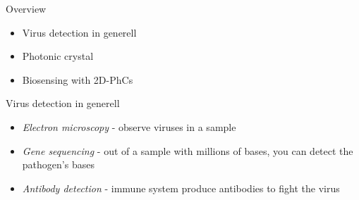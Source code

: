 


\frame{\maketitle}


\begin{frame}{Overview}
\begin{itemize}
  \setlength\itemsep{1.2em}
  \item{Virus detection in generell}
  \item{Photonic crystal}
  \item{Biosensing with 2D-PhCs}
\end{itemize}

\end{frame}

\begin{frame}{Virus detection in generell}
  \begin{itemize}
    \setlength\itemsep{1.2em}
    \item{\emph{Electron microscopy} - observe viruses in a sample   }
    \item{\emph{Gene sequencing} - out of a sample with millions of bases, you can detect the pathogen's bases   }
    \item{\emph{ Antibody detection} - immune system produce antibodies to fight the virus }
    \end{itemize}
\end{frame}

